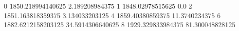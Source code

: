 0 1850.218994140625 2.189208984375
1 1848.02978515625 0.0
2 1851.163818359375 3.134033203125
4 1859.40380859375 11.3740234375
6 1882.6212158203125 34.5914306640625
8 1929.329833984375 81.300048828125
